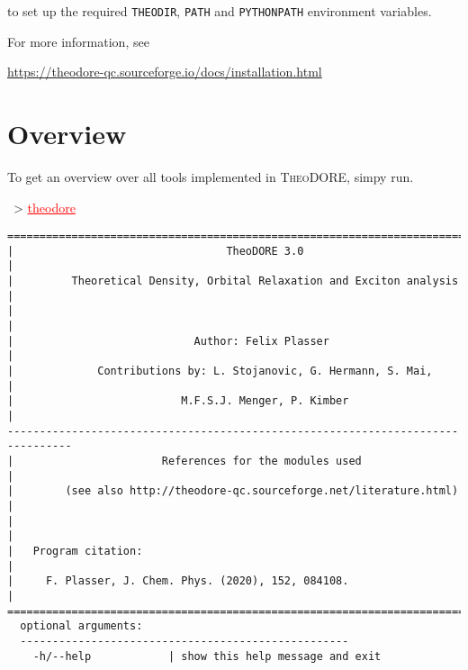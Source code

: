 \documentclass[DIV=12,headings=normal]{scrartcl}
\newcommand{\redl}[1]{{\textcolor{red}{\underline{#1}}}}
\newcommand{\comm}[1]{
\small
~> \redl{#1}
\normalsize
}
\newcommand{\theo}{\textsc{TheoDORE}}
\begin{document}
to set up the required \texttt{THEODIR}, \texttt{PATH} and \texttt{PYTHONPATH} environment variables.

For more information, see

\url{https://theodore-qc.sourceforge.io/docs/installation.html}

\clearpage
\section{Overview}
To get an overview over all tools implemented in \theo{}, simpy run.

\comm{theodore}

\scriptsize
\begin{Verbatim}[commandchars=\\\{\}]
================================================================================
|                                 TheoDORE 3.0                                 |
|         Theoretical Density, Orbital Relaxation and Exciton analysis         |
|                                                                              |
|                            Author: Felix Plasser                             |
|             Contributions by: L. Stojanovic, G. Hermann, S. Mai,             |
|                          M.F.S.J. Menger, P. Kimber                          |
--------------------------------------------------------------------------------
|                       References for the modules used                        |
|        (see also http://theodore-qc.sourceforge.net/literature.html)         |
|                                                                              |
|   Program citation:                                                          |
|     F. Plasser, J. Chem. Phys. (2020), 152, 084108.                          |
================================================================================
  optional arguments:
  ---------------------------------------------------
    -h/--help            | show this help message and exit                   


\end{Verbatim}
\end{document}
